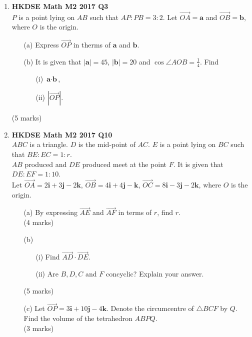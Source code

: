 \documentclass{report}
\begin{document}
\begin{enumerate}
	\item \textbf{HKDSE Math M2 2017 Q3}\\
	$P$ is a point lying on $AB$ such that $AP : PB = 3:2$. Let $\overrightarrow{OA} = \textbf{a}$ and $\overrightarrow{OB} = \textbf{b}$, where $O$ is the origin.
	\begin{enumerate}
		\item [(a)] Express $\overrightarrow{OP} $ in therms of $ \textbf{a}$ and $ \textbf{b}$.
		\item [(b)] It is given that $|\textbf{a}| = 45$, $|\textbf{b}| = 20$ and $\cos{\angle{AOB}} = \displaystyle\frac{1}{4}$. Find
		\begin{enumerate}
			\item [(i)] $\textbf{a}   \cdot  \textbf{b} $, 
			\item [(ii)] $|\overrightarrow{OP}| $. 
		\end{enumerate}
	\end{enumerate}
	(5 marks)

	\item \textbf{HKDSE Math M2 2017 Q10}\\
	$ABC$ is a triangle. $D$ is the mid-point of $AC$. $E$ is a point lying on $BC$ such that $BE : EC = 1 : r$. \\
	$AB$ produced and $DE$ produced meet at the point $F$. It is given that $DE : EF = 1 : 10$. \\
	Let $\overrightarrow{OA} = 2\textbf{i} +3 \textbf{j} -2\textbf {k}$, 
		$\overrightarrow{OB} = 4\textbf{i} +4 \textbf{j} - \textbf {k}$, 
		$\overrightarrow{OC} = 8\textbf{i} -3 \textbf{j} -2\textbf {k}$, where $O$ is the origin.
	\begin{enumerate}
		\item [(a)]By expressing $\overrightarrow{AE}$ and $\overrightarrow{AF}$ in terms of $r$, find $r$.\\(4 marks)
		\item [(b)]
		\begin{enumerate}
			\item [(i)]Find $\overrightarrow{AD} \cdot \overrightarrow{DE}$. 
			\item [(ii)]Are $B, D, C$ and $F$ concyclic? Explain your answer.
		\end{enumerate}
		(5 marks)
		\item[(c)]Let $\overrightarrow{OP} = 3\textbf{i} +10 \textbf{j} -4\textbf {k}$. Denote the circumcentre of $\triangle BCF $ by $ Q$.\\
		Find the volume of the tetrahedron $ABPQ$.\\(3 marks)
	\end{enumerate}


\end{enumerate}
\end{document}
